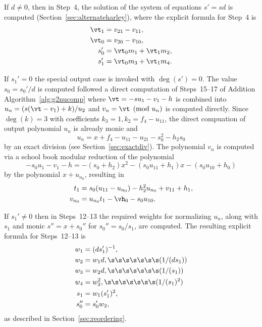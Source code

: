 If $d \neq 0$, then in Step~4, the solution of the system of equations $s' = sd$
is computed (Section~\ref{sec:alternateharley}), where the explicit formula
for Step~4 is
\begin{align*}
    \vt_1 &= v_{21} - v_{11},\\
    \vt_0 &= v_{20} - v_{10},\\
    s_0' &= \vt_0m_1 + \vt_1m_2,\\
    s_1' &= \vt_0m_3 + \vt_1m_4.
\end{align*}

If $s_1' = 0$ the special output case is invoked with $\deg(s') = 0$. The value
$s_0 = s_0'/d$ is computed followed a direct computation of Steps~15--17 of
Addition Algorithm~\ref{alg:g2nucomp} where $\vt = -su_1 - v_1 - h$ is
combined into $u_n =(s(\vt - v_1) + k)/u_2$ and $v_n = \vt \pmod{u_n}$ is
computed directly. Since $\deg(k) = 3$ with coefficients $k_3 = 1, k_2 = f_4 -
u_{11}$, the direct compuation of output polynomial $u_n$ is already monic and
$$u_n = x + f_4 - u_{11} - u_{21} - s_0^2 - h_2s_0$$ by an exact division (see
Section~\ref{sec:exactdiv}). The polynomial $v_n$
is computed via a school book modular reduction of the polynomial $$-s_0u_1 - v_1 - h =
-(s_0 + h_2)x^2 - (s_0u_{11} + h_1)x - (s_0u_{10} + h_0)$$ by the polynomial $x
+ u_{n_0}$, resulting in
\begin{align*} t_1 &= s_0(u_{11} - u_{n_0}) - h_2^2u_{n_0} + v_{11} + h_1,\\
v_{n_0} &= u_{n_0}t_1 - \vh_0 - s_0u_{10}.    
\end{align*}

If $s_1' \neq 0$ then in Steps~12--13 the required weights for normalizing
$u_n$, along with $s_1$ and monic $s'' = x + s_0''$ for $s_0'' = s_0/s_1$, are
computed. The resulting explicit formula for Steps~12--13 is 
\begin{align*} 
    w_1 &= (ds_1')^{-1},\\
    w_2 &= w_1d, \s\s\s\s\s\s\s (1/(ds_1))\\
    w_3 &= w_2d, \s\s\s\s\s\s\s (1/(s_1))\\
    w_4 &= w_3^2, \s\s\s\s\s\s\s (1/(s_1)^2)\\
    s_1 &= w_1(s_1')^2,\\
    s_0'' &= s_0'w_2,
\end{align*} as described in Section~\ref{sec:reordering}.

